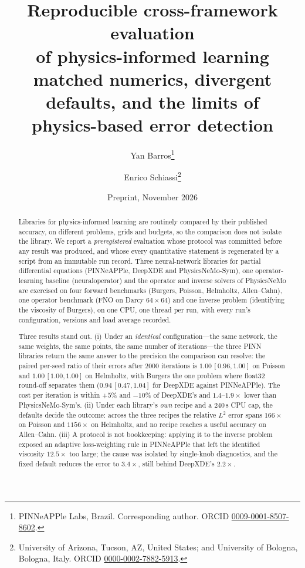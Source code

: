 \documentclass[11pt]{article}
\title{Reproducible cross-framework evaluation\\ of physics-informed learning\\[4pt]
       {\large matched numerics, divergent defaults, and the limits of\\ physics-based error detection}}
\author{Yan Barros\thanks{PINNeAPPle Labs, Brazil. Corresponding author.
        ORCID \href{https://orcid.org/0009-0001-8507-8602}{0009-0001-8507-8602}.} \and
        Enrico Schiassi\thanks{University of Arizona, Tucson, AZ, United States; and University of
        Bologna, Bologna, Italy. ORCID \href{https://orcid.org/0000-0002-7882-5913}{0000-0002-7882-5913}.}}
\date{Preprint, November 2026}
\begin{document}
\maketitle

\begin{abstract}
Libraries for physics-informed learning are routinely compared by their published accuracy, on
different problems, grids and budgets, so the comparison does not isolate the library. We report a
\emph{preregistered} evaluation whose protocol was committed before any result was produced, and
whose every quantitative statement is regenerated by a script from an immutable run record. Three
neural-network libraries for partial differential equations (PINNeAPPle, DeepXDE and
PhysicsNeMo-Sym), one operator-learning baseline (neuraloperator) and the operator and inverse
solvers of PhysicsNeMo are exercised on four forward benchmarks (Burgers, Poisson, Helmholtz,
Allen--Cahn), one operator benchmark (FNO on Darcy $64\times64$) and one inverse problem
(identifying the viscosity of Burgers), on one CPU, one thread per run, with every run's
configuration, versions and load average recorded.

Three results stand out. (i) Under an \emph{identical} configuration---the same network, the same
weights, the same points, the same number of iterations---the three PINN libraries return the same
answer to the precision the comparison can resolve: the paired per-seed ratio of their errors after
2000 iterations is $1.00\,[0.96,1.00]$ on Poisson and $1.00\,[1.00,1.00]$ on Helmholtz, with
Burgers the one problem where float32 round-off separates them ($0.94\,[0.47,1.04]$ for DeepXDE
against PINNeAPPle). The cost per iteration is within $+5\%$ and $-10\%$ of DeepXDE's and
$1.4$--$1.9\times$ lower than PhysicsNeMo-Sym's. (ii) Under each library's \emph{own} recipe and a
240\,s CPU cap, the defaults decide the outcome: across the three recipes the relative $L^2$ error
spans $166\times$ on Poisson and $1156\times$ on Helmholtz, and no recipe reaches a useful accuracy
on Allen--Cahn. (iii) A protocol is not bookkeeping: applying it to the inverse problem exposed an
adaptive loss-weighting rule in PINNeAPPle that left the identified viscosity $12.5\times$ too
large; the cause was isolated by single-knob diagnostics, and the fixed default reduces the error to
$3.4\times$, still behind DeepXDE's $2.2\times$.


\end{abstract}
\end{document}
